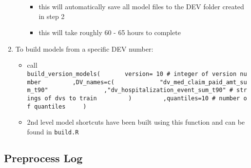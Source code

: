 \documentclass[
]{book}
\providecommand{\tightlist}{%
  \setlength{\itemsep}{0pt}\setlength{\parskip}{0pt}}
\begin{document}
\begin{enumerate}
\begin{itemize}
    \begin{itemize}
    \tightlist
    \item
      this will automatically save all model files to the DEV folder created in step 2
    \item
      this will take roughly 60 - 65 hours to complete
    \end{itemize}
  \end{itemize}
\item
  To build models from a specific DEV number:

  \begin{itemize}
  \tightlist
  \item
    call
    \texttt{build\_version\_models(\ \ \ \ \ \ \ version=\ 10\ \#\ integer\ of\ version\ number\ \ \ \ \ \ \ \ \ ,DV\_names=c(\ \ \ \ \ \ \ \ \ \ \ \ \ "dv\_med\_claim\_paid\_amt\_sum\_t90"\ \ \ \ \ \ \ \ \ \ \ \ \ \ \ \ ,"dv\_hospitalization\_event\_sum\_t90"\ \#\ strings\ of\ dvs\ to\ train\ \ \ \ \ \ \ \ \ )\ \ \ \ \ \ \ \ \ ,quantiles=10\ \#\ number\ of\ quantiles\ \ \ \ \ )}
  \item
    2nd level model shortcuts have been built using this function and can be found in \texttt{build.R}
  \end{itemize}
\end{enumerate}

\hypertarget{preprocess-log}{%
\subsection{Preprocess Log}\label{preprocess-log}}
\end{document}
